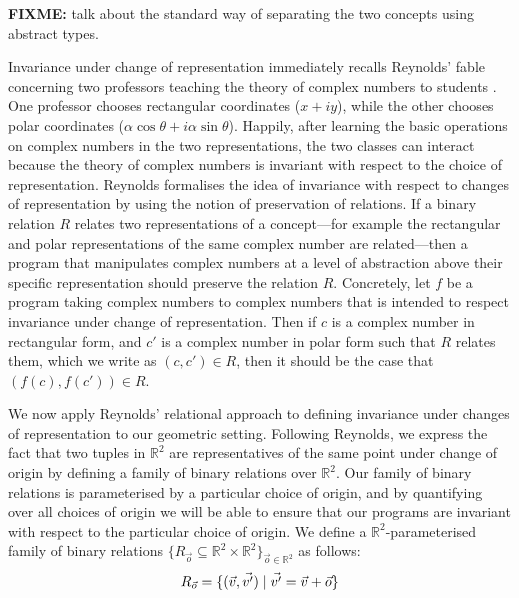 \textbf{FIXME:} talk about the standard way of separating the two
concepts using abstract types.

Invariance under change of representation immediately recalls
Reynolds' fable concerning two professors teaching the theory of
complex numbers to students \cite{reynolds83types}. One professor
chooses rectangular coordinates ($x + iy$), while the other chooses
polar coordinates ($\alpha\cos\theta + i\alpha\sin\theta$). Happily,
after learning the basic operations on complex numbers in the two
representations, the two classes can interact because the theory of
complex numbers is invariant with respect to the choice of
representation. Reynolds formalises the idea of invariance with
respect to changes of representation by using the notion of
preservation of relations. If a binary relation $R$ relates two
representations of a concept---for example the rectangular and polar
representations of the same complex number are related---then a
program that manipulates complex numbers at a level of abstraction
above their specific representation should preserve the relation
$R$. Concretely, let $f$ be a program taking complex numbers to
complex numbers that is intended to respect invariance under change of
representation. Then if $c$ is a complex number in rectangular form,
and $c'$ is a complex number in polar form such that $R$ relates them,
which we write as $(c,c') \in R$, then it should be the case that
$(f(c), f(c')) \in R$.

We now apply Reynolds' relational approach to defining invariance
under changes of representation to our geometric setting. Following
Reynolds, we express the fact that two tuples in $\mathbb{R}^2$ are
representatives of the same point under change of origin by defining a
family of binary relations over $\mathbb{R}^2$. Our family of binary
relations is parameterised by a particular choice of origin, and by
quantifying over all choices of origin we will be able to ensure that
our programs are invariant with respect to the particular choice of
origin. We define a $\mathbb{R}^2$-parameterised family of binary
relations $\{ R_{\vec{o}} \subseteq \mathbb{R}^2 \times \mathbb{R}^2
\}_{\vec{o} \in \mathbb{R}^2}$ as follows:
\begin{displaymath}
  R_{\vec{o}} = \{ (\vec{v}, \vec{v'}) \mathrel| \vec{v'} = \vec{v} + \vec{o} \}
\end{displaymath}

